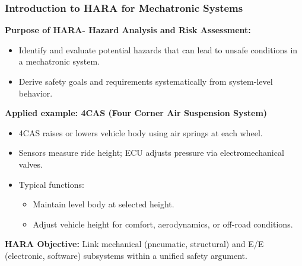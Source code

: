 \begin{frame}
	\frametitle{Introduction to HARA for Mechatronic Systems}
  \textbf{Purpose of HARA- Hazard Analysis and Risk Assessment:}
  \begin{itemize}
    \item Identify and evaluate potential hazards that can lead to unsafe conditions in a mechatronic system.
    \item Derive safety goals and requirements systematically from system-level behavior.
  \end{itemize}
  \textbf{Applied example: 4CAS (Four Corner Air Suspension System)}
  \begin{itemize}
    \item 4CAS raises or lowers vehicle body using air springs at each wheel.
    \item Sensors measure ride height; ECU adjusts pressure via electromechanical valves.
    \item Typical functions:
      \begin{itemize}
        \item Maintain level body at selected height.
        \item Adjust vehicle height for comfort, aerodynamics, or off-road conditions.
      \end{itemize}
  \end{itemize}
  \textbf{HARA Objective:}
  Link mechanical (pneumatic, structural) and E/E (electronic, software) subsystems within a unified safety argument.
\end{frame}

